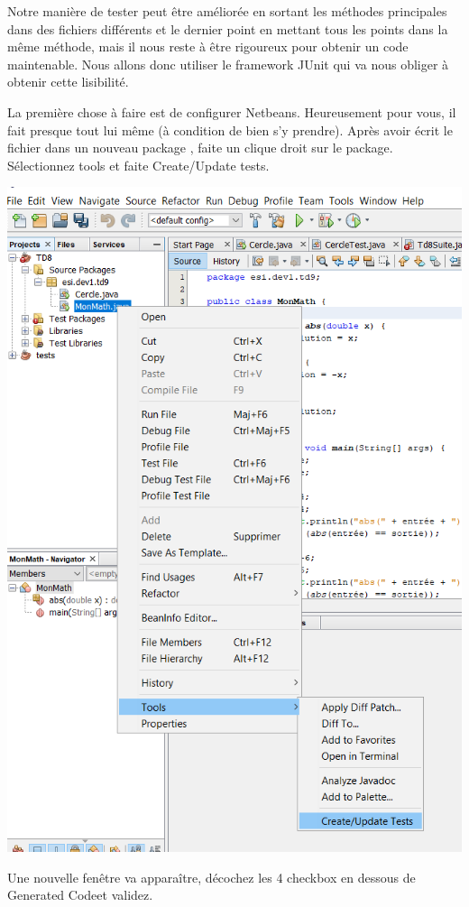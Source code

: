 \documentclass[a4paper,11pt]{article}
\begin{document}
	Notre manière de tester peut être améliorée en sortant les méthodes principales dans des fichiers différents et le dernier point en mettant tous les points dans la même méthode, mais il nous reste à être rigoureux pour obtenir un code maintenable. Nous allons donc utiliser le framework JUnit qui va nous obliger à obtenir cette lisibilité.

	La première chose à faire est de configurer Netbeans. Heureusement pour vous, il fait presque tout lui même (à condition de bien s’y prendre).
	Après avoir écrit le fichier  dans un nouveau package , faite un clique droit sur le package. Sélectionnez tools et faite Create/Update tests.

	\begin{center}
		\includegraphics[width=.7\textwidth]{images/create_tests.png}
	\end{center}


	Une nouvelle fenêtre va apparaître, décochez les 4 checkbox en dessous de \og Generated Code\fg et validez. 
\end{document}
